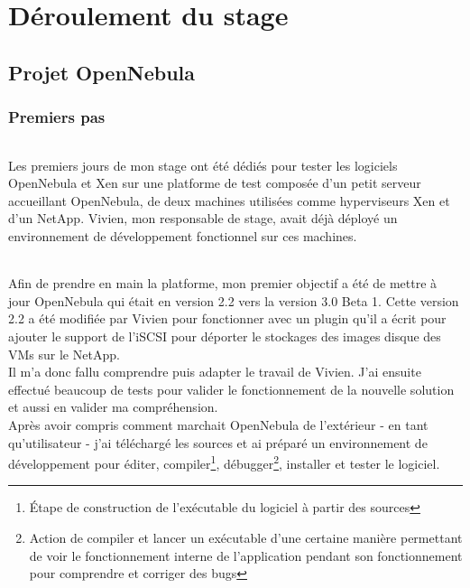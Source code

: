 \part{Déroulement du stage}

\chapter{Projet OpenNebula}

\section{Premiers pas}

\paragraph*{}
Les premiers jours de mon stage ont été dédiés pour tester les logiciels OpenNebula et Xen sur une platforme de test
composée d'un petit serveur accueillant OpenNebula, de deux machines utilisées comme hyperviseurs Xen et d'un NetApp.
Vivien, mon responsable de stage, avait déjà déployé un environnement de développement fonctionnel sur ces machines.

\paragraph*{}
Afin de prendre en main la platforme, mon premier objectif a été de mettre à jour OpenNebula qui était en version 2.2 vers la version 3.0 Beta 1.
Cette version 2.2 a été modifiée par Vivien pour fonctionner avec un plugin qu'il a écrit pour ajouter le support de l'iSCSI pour déporter le stockages des images
disque des VMs sur le NetApp.
\\
Il m'a donc fallu comprendre puis adapter le travail de Vivien. J'ai ensuite effectué beaucoup de tests pour valider le fonctionnement
de la nouvelle solution et aussi en valider ma compréhension.
\\
Après avoir compris comment marchait OpenNebula de l'extérieur - en tant qu'utilisateur - j'ai téléchargé les sources et ai préparé un
environnement de développement pour éditer, compiler\footnote{Étape de construction de l'exécutable du logiciel à partir des sources},
débugger\footnote{Action de compiler et lancer un exécutable d'une certaine manière permettant de voir le fonctionnement interne de l'application
pendant son fonctionnement pour comprendre et corriger des bugs}, installer et tester le logiciel.

